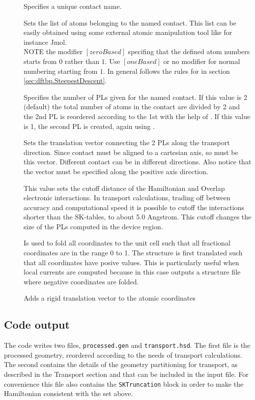 \begin{description}
\item[] Specifies a unique contact name.
\item[] Sets the list of atoms belonging to the named contact. This list can
	be easily obtained using some external atomic manipulation tool like for instance Jmol. \\ 
	NOTE the modifier $[zeroBased]$ specifing that the defined atom numbers starts from $0$
	rather than $1$. Use $[oneBased]$ or no modifier for normal numbering starting from $1$.
	In general follows the rules for  in section \ref{sec:dftbp.SteepestDescent}.
\item[] Specifies the number of PLs given for the named contact. If this value 
	is 2 (default) the total number of atoms in the contact are divided by 2 and the 2nd PL
	is reordered according to the 1st with the help of . If this value is 1, 
	the second PL is created, again using . 
\item[] Sets the translation vector connecting the 2 PLs along the transport direction. 
	Since contact must be aligned to a cartesian axis, so must be this vector. Different contact
      can be in different directions. Also notice that the vector must be specified along the positive axis 
      direction.
\item[]  This value sets the cutoff distance of the Hamiltonian and Overlap electronic
     interactions. In transport calculations, trading off between accuracy and computational speed
     it is possible to cutoff the interactions shorter than the SK-tables, to about 5.0 Angstrom. 
     This cutoff changes the size of the PLs computed in the device region.	
\item[] Is used to fold all coordinates to the unit cell such that all fractional
	coordinates are in the range 0 to 1. The structure is first translated such that all coordinates
	have posive values. This is particularly useful when local currents are computed 
	because in this case \dftbp{} outputs a structure file where negative coordinates are folded.
\item[] Adds a rigid translation vector to the atomic coordinates  

\end{description}

\subsection{Code output}

The code writes two files, \verb|processed.gen| and \verb|transport.hsd|. The first file is the 
processed geometry, reordered according to the needs of transport calculations. The second 
contains the details of the geometry partitioning for transport, as described in the Transport 
section and that can be included in the input file.
For convenience this file also contains the \verb|SKTruncation| block in order to 
make the Hamiltonian consistent with the  set above. 


